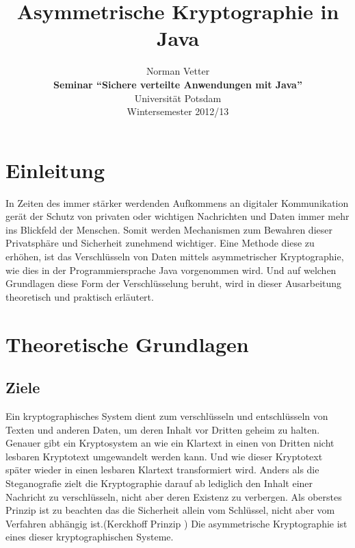 \documentclass[paper=a4,11pt,german]{scrartcl} %
\begin{document}
%
\title{Asymmetrische Kryptographie in Java}

\author{Norman Vetter\\
\textbf{Seminar "`Sichere verteilte Anwendungen mit Java"'}\\
Universität Potsdam\\
Wintersemester 2012/13}

\date{}

\maketitle

%
\newpage
\tableofcontents
\newpage
\section{Einleitung}

In Zeiten des immer stärker werdenden Aufkommens an digitaler Kommunikation gerät der Schutz von privaten oder wichtigen Nachrichten und Daten immer mehr ins Blickfeld der Menschen. Somit werden Mechanismen zum Bewahren dieser Privatsphäre und Sicherheit zunehmend wichtiger. Eine Methode diese zu erhöhen, ist das Verschlüsseln von Daten mittels asymmetrischer Kryptographie, wie dies in der Programmiersprache Java vorgenommen wird. Und auf welchen Grundlagen diese Form der Verschlüsselung beruht, wird in dieser Ausarbeitung theoretisch und praktisch erläutert.
       
\section{Theoretische Grundlagen}

\subsection{Ziele}
Ein kryptographisches System dient zum verschlüsseln und entschlüsseln von Texten und anderen Daten, um deren Inhalt vor Dritten geheim zu halten. Genauer gibt ein Kryptosystem an wie ein Klartext in einen von Dritten nicht lesbaren Kryptotext umgewandelt werden kann. Und wie dieser Kryptotext später wieder in einen lesbaren Klartext transformiert wird. Anders als die Steganografie zielt die Kryptographie darauf ab lediglich den Inhalt einer Nachricht zu verschlüsseln, nicht aber deren Existenz zu verbergen. Als oberstes Prinzip ist zu beachten das die Sicherheit allein vom Schlüssel, nicht aber vom Verfahren abhängig ist.(Kerckhoff Prinzip \cite{Eckert13}) Die asymmetrische Kryptographie ist eines dieser kryptographischen Systeme.
\end{document}
